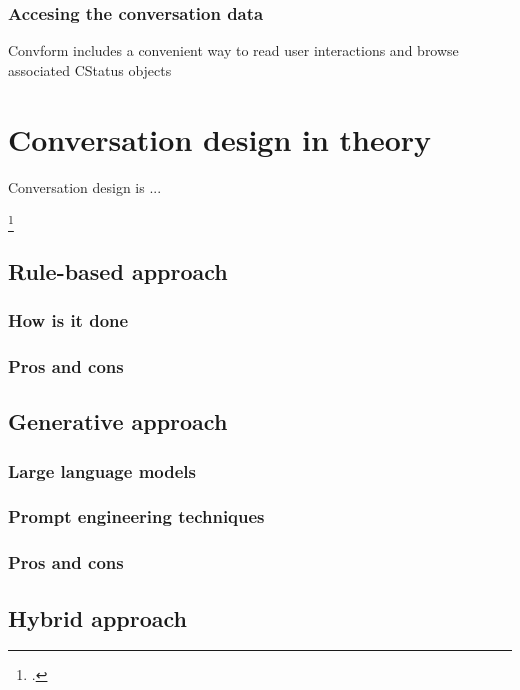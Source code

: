 \documentclass[12pt]{report}
\begin{document}
{\subsubsection{Accesing the conversation data}
Convform includes a convenient way to read user interactions
and browse associated CStatus objects

\section{Conversation design in theory}

\par
Conversation design is ...

\footcite{kolosova2022}

\subsection{Rule-based approach}

\subsubsection{How is it done}

\subsubsection{Pros and cons}


\subsection{Generative approach}

\subsubsection{Large language models}

\subsubsection{Prompt engineering techniques}

\subsubsection{Pros and cons}



\subsection{Hybrid approach}



}
\end{document}
